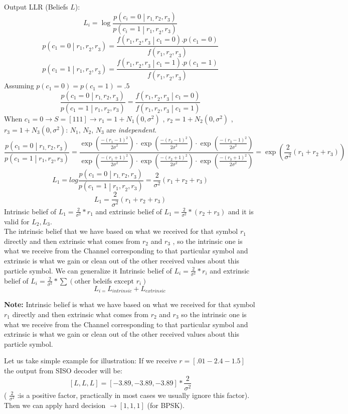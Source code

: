 Output LLR (Beliefs $L$):
\[L_i=\log\frac{p\left(c_i=0\middle| r_{1,}r_2{,r}_3\right)}{p\left(c_i=1\middle| r_1{,r}_2,r_3\right)}\]
\[p\left(c_1=0\middle| r_1{,r}_2{,r}_3\right)=\frac{f\left(r_1{,r}_2{,r}_3\middle| c_1=0\right).p(c_1=0)}{f(r_1{,r}_2{,r}_3)}\]
\[p\left(c_1=1\middle| r_1{,r}_2{,r}_3\right)=\frac{f\left(r_1{,r}_2{,r}_3\middle| c_1=1\right).p(c_1=1)}{f(r_1{,r}_2{,r}_3)}\]
Assuming $p\left(c_1=0\right)=p\left(c_1=1\right)=.5$
\[\frac{p\left(c_1=0\middle| r_{1,}r_2{,r}_3\right)}{p\left(c_1=1\middle| r_1{,r}_2,r_3\right)}=\frac{f\left(r_1{,r}_2{,r}_3\middle| c_1=0\right)}{f\left(r_1{,r}_2{,r}_3\middle| c_1=1\right)}\]
When $c_1=0 \rightarrow S=[1 1 1] \rightarrow  r_1=1+N_1(0,\sigma^2)$ , $r_2=1+N_2(0,\sigma^2)$ , $r_3=1+N_3(0,\sigma^2)$: $N_1$, $N_2$, $N_3$ are \emph{independent}.
\[\frac{p\left(c_1=0\middle| r_{1,}r_2{,r}_3\right)}{p\left(c_1=1\middle| r_1{,r}_2,r_3\right)}=\frac{\exp \left( {\frac{{-(r_1-1)}^2}{{2\sigma}^2}}\right) \cdot \exp \left( {\frac{{-(r_2-1)}^2}{{2\sigma}^2}}\right) \cdot \exp \left( {\frac{{-(r_3-1)}^2}{{2\sigma}^2}}\right)}{\exp \left( {\frac{{-(r_1+1)}^2}{{2\sigma}^2}}\right)\cdot\exp \left( {\frac{{-(r_2+1)}^2}{{2\sigma}^2}}\right)\cdot\exp \left( {\frac{{-(r_3+1)}^2}{{2\sigma}^2}}\right)}=\exp \left( {\frac{2}{\sigma^2}(r_1+r_2+r_3)}\right)\]
\[L_1=log\frac{p\left(c_1=0\middle| r_{1,}r_2{,r}_3\right)}{p\left(c_1=1\middle| r_1{,r}_2,r_3\right)}=\frac{2}{\sigma^2}(r_1+r_2+r_3)\]
\[L_1=\frac{2}{\sigma^2}(r_1+r_2+r_3)\]
Intrinsic belief of $L_1=\frac{2}{\sigma^2}\ast r_1$ and extrinsic belief of $L_1=\frac{2}{\sigma^2}\ast(r_2+r_3)$ and it is valid for $L_{2},L_3 $.\\
The intrinsic belief that we have based on what we received for that symbol $r_1$ directly and then extrinsic what comes from $r_2$ and $r_3$ , so the intrinsic one is what we receive from the Channel corresponding to that particular symbol and extrinsic is what we gain or clean out of the other received values about this particle symbol.
We can generalize it Intrinsic belief of $L_i=\frac{2}{\sigma^2}\ast r_i$ and extrinsic belief of $L_i=\frac{2}{\sigma^2}\ast \sum \left( \text{other beleifs except }r_i \right)$
\[L_{i=}L_{intrinsic}+L_{extrinsic\ }\]
\begin{GrayBox}
    \textbf{Note:} Intrinsic belief is what we have based on what we received for that symbol $r_1$ directly and then extrinsic what comes from $r_2$ and $r_3$ so the intrinsic one is what we receive from the Channel corresponding to that particular symbol and extrinsic is what we gain or clean out of the other received values about this particle symbol.
\end{GrayBox}
Let us take simple example for illustration:
If we receive $r = [.01 -2.4 -1.5]$ the output from SISO decoder will be:
\[[L, L, L] = [-3.89, -3.89, -3.89] \ast \frac{2}{\sigma^2} \] 
( $\frac{2}{\sigma^2}$ :is a positive factor, practically in most cases we usually ignore this factor). 
Then we can apply hard decision $\rightarrow [1, 1, 1]$ (for BPSK).
